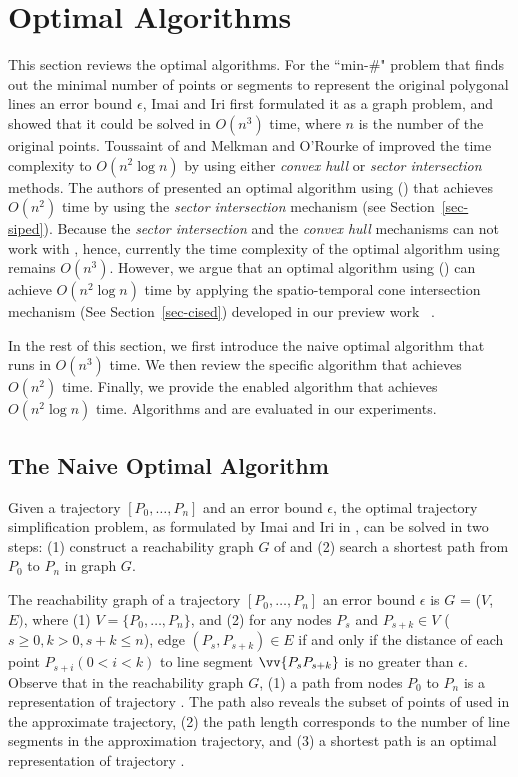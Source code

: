 \section{Optimal Algorithms}
\label{sec-optimal}

This section reviews the optimal \lsa algorithms.
For the ``min-\#" problem that finds out the minimal number of points or segments to represent the original polygonal lines \wrt an error bound $\epsilon$, Imai and Iri \cite{Imai:Optimal} first formulated it as a graph problem, and showed that it could be solved in  $O(n^3)$ time, where $n$ is the number of the original points.
%
Toussaint of \cite{Toussaint:Optimal} and Melkman and O'Rourke of \cite{Melkman:Optimal} improved the time complexity to $O(n^2 \log n)$ by using either \textit{convex hull} or \textit{sector intersection} methods.
%
The authors of \cite{Chan:Optimal} presented an optimal algorithm using \ped (\oped) that achieves $O(n^2)$ time by using the \textit{sector intersection} mechanism (see Section~\ref{sec-siped}).
Because the \textit{sector intersection} and the \textit{convex hull} mechanisms can not work with \sed, hence, currently the time complexity of the optimal algorithm using \sed remains $O(n^3)$.
However, we argue that an optimal \lsa algorithm using \sed (\osed) can achieve $O(n^2 \log n)$ time by applying the spatio-temporal cone intersection mechanism (See Section~\ref{sec-cised}) developed in our preview work \cised~\cite{Lin:Cised}. 



In the rest of this section, we first introduce the naive optimal \lsa algorithm \cite{Imai:Optimal} that runs in $O(n^3)$ time. We then review the \ped specific algorithm \oped \cite{Chan:Optimal} that achieves $O(n^2)$ time. Finally, we provide the \sed enabled algorithm \osed that achieves $O(n^2 \log n)$ time. 
Algorithms \oped and \osed are evaluated in our experiments.

\subsection{The Naive Optimal Algorithm}
Given a trajectory ${[P_0, \ldots, P_n]}$ and an error bound $\epsilon$, the optimal trajectory simplification problem, as formulated by Imai and Iri in \cite{Imai:Optimal}, can be solved in two steps: (1) construct a reachability graph $G$ of  and (2) search a shortest path from $P_0$ to $P_{n}$ in graph $G$.

The reachability graph of a trajectory ${[P_0, \ldots, P_n]}$ \wrt an error bound $\epsilon$ is $G$ = ($V$, $E)$, where (1) $V = \{P_0, \ldots, P_n\}$, and (2) for any nodes $P_s$ and $P_{s+k} \in V$ ($s\ge 0, k>0, s+k\le n$), edge $(P_s, P_{s+k}) \in E$ if and only if the distance of each point $P_{s+i} (0<i<k)$ to line segment $\vv{P_sP_{s+k}}$ is no greater than $\epsilon$.
%
Observe that in the reachability graph $G$, (1) a path from nodes $P_0$ to $P_{n}$ is a representation of trajectory . The path also reveals the subset of points of  used in the approximate trajectory, (2) the path length corresponds to the number of line segments in the approximation trajectory, and 
(3) a shortest path is an optimal representation of trajectory .

